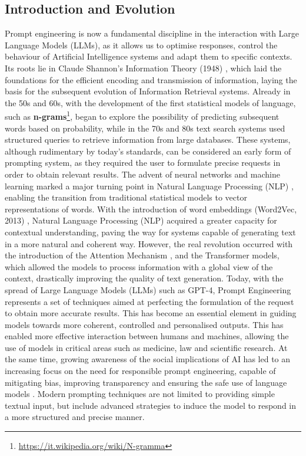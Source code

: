 \subsection{Introduction and Evolution}
Prompt engineering is now a fundamental discipline in the interaction with Large Language Models (LLMs), as it allows us to optimise responses, control the behaviour of Artificial Intelligence systems and adapt them to specific contexts. Its roots lie in Claude Shannon's Information Theory (1948) \cite{IT}, which laid the foundations for the efficient encoding and transmission of information, laying the basis for the subsequent evolution of Information Retrieval systems.
Already in the 50s and 60s, with the development of the first statistical models of language, such as \textbf{n-grams}\footnote{\url{https://it.wikipedia.org/wiki/N-gramma}}, began to explore the possibility of predicting subsequent words based on probability, while in the 70s and 80s text search systems used structured queries to retrieve information from large databases.
These systems, although rudimentary by today's standards, can be considered an early form of prompting system, as they required the user to formulate precise requests in order to obtain relevant results.
The advent of neural networks and machine learning marked a major turning point in Natural Language Processing (NLP) \cite{NLP}, enabling the transition from traditional statistical models to vector representations of words. With the introduction of word embeddings (Word2Vec, 2013) \cite{Word2vec}, Natural Language Processing (NLP) acquired a greater capacity for contextual understanding, paving the way for systems capable of generating text in a more natural and coherent way.
However, the real revolution occurred with the introduction of the Attention Mechanism \cite{Attention}, and the Transformer models, which allowed the models to process information with a global view of the context, drastically improving the quality of text generation.
Today, with the spread of Large Language Models (LLMs) such as GPT-4, Prompt Engineering represents a set of techniques aimed at perfecting the formulation of the request to obtain more accurate results. This has become an essential element in guiding models towards more coherent, controlled and personalised outputs. This has enabled more effective interaction between humans and machines, allowing the use of models in critical areas such as medicine, law and scientific research. At the same time, growing awareness of the social implications of AI has led to an increasing focus on the need for responsible prompt engineering, capable of mitigating bias, improving transparency and ensuring the safe use of language models \cite{schulhoff2025promptreportsystematicsurvey}.
Modern prompting techniques are not limited to providing simple textual input, but include advanced strategies to induce the model to respond in a more structured and precise manner.
